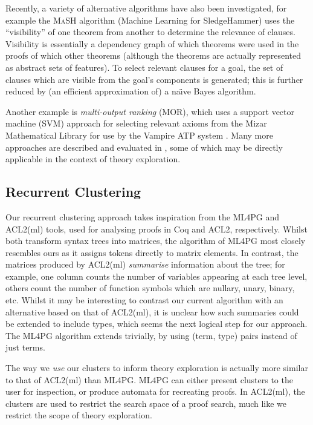 Recently, a variety of alternative algorithms have also been investigated, for example the \textsc{MaSH} algorithm (Machine Learning for SledgeHammer) \cite{kuhlwein2013mash} uses the ``visibility'' of one theorem from another to determine the relevance of clauses. Visibility is essentially a dependency graph of which theorems were used in the proofs of which other theorems (although the theorems are actually represented as abstract sets of features). To select relevant clauses for a goal, the set of clauses which are visible from the goal's components is generated; this is further reduced by (an efficient approximation of) a na\"{\i}ve Bayes algorithm.

Another example is \emph{multi-output ranking} (MOR), which uses a support vector machine (SVM) approach for selecting relevant axioms from the Mizar Mathematical Library for use by the Vampire ATP system \cite{alama2014premise}. Many more approaches are described and evaluated in \cite{kuhlwein2012overview}, some of which may be directly applicable in the context of theory exploration.

\subsection{Recurrent Clustering}
\label{sec:clusteringexpressions}

Our recurrent clustering approach takes inspiration from the ML4PG \cite{journals/corr/abs-1212-3618} and ACL2(ml) \cite{heras2013proof} tools, used for analysing proofs in Coq and ACL2, respectively. Whilst both transform syntax trees into matrices, the algorithm of ML4PG most closely resembles ours as it assigns tokens directly to matrix elements. In contrast, the matrices produced by ACL2(ml) \emph{summarise} information about the tree; for example, one column counts the number of variables appearing at each tree level, others count the number of function symbols which are nullary, unary, binary, etc. Whilst it may be interesting to contrast our current algorithm with an alternative based on that of ACL2(ml), it is unclear how such summaries could be extended to include types, which seems the next logical step for our approach. The ML4PG algorithm extends trivially, by using (term, type) pairs instead of just terms.

The way we \emph{use} our clusters to inform theory exploration is actually more similar to that of ACL2(ml) than ML4PG. ML4PG can either present clusters to the user for inspection, or produce automata for recreating proofs. In ACL2(ml), the clusters are used to restrict the search space of a proof search, much like we restrict the scope of theory exploration.

